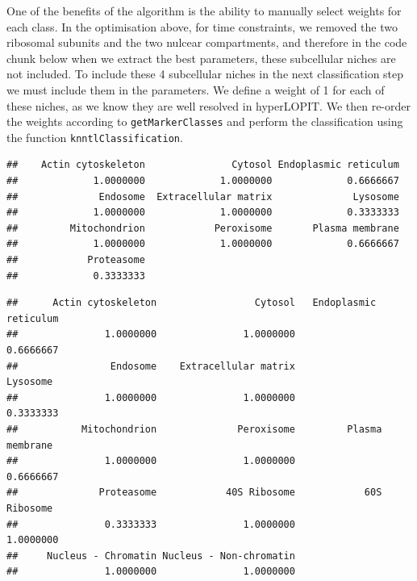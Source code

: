 One of the benefits of the algorithm is the ability to manually select
weights for each class. In the optimisation above, for time
constraints, we removed the two ribosomal subunits and the two nulcear
compartments, and therefore in the code chunk below when we extract
the best parameters, these subcellular niches are not included. To
include these 4 subcellular niches in the next classification step we
must include them in the parameters. We define a weight of 1 for each
of these niches, as we know they are well resolved in hyperLOPIT. We
then re-order the weights according to \texttt{getMarkerClasses} and
perform the classification using the function
\texttt{knntlClassification}.

\begin{knitrout}
\color{fgcolor}\begin{kframe}
\begin{alltt}
 \hlkwb{<-} 
\end{alltt}
\begin{verbatim}
##    Actin cytoskeleton               Cytosol Endoplasmic reticulum 
##             1.0000000             1.0000000             0.6666667 
##              Endosome  Extracellular matrix              Lysosome 
##             1.0000000             1.0000000             0.3333333 
##         Mitochondrion            Peroxisome       Plasma membrane 
##             1.0000000             1.0000000             0.6666667 
##            Proteasome 
##             0.3333333
\end{verbatim}
\begin{alltt}
 \hlkwb{<-} \hlstd{(}\hlstd{,} \hlstd{)}
 \hlkwb{<-} \hlstd{(}\hlstd{,} \hlstd{,}
                         \hlstd{,}
                         \hlstd{)}
 \hlkwb{<-} 
\end{alltt}
\begin{verbatim}
##      Actin cytoskeleton                 Cytosol   Endoplasmic reticulum 
##               1.0000000               1.0000000               0.6666667 
##                Endosome    Extracellular matrix                Lysosome 
##               1.0000000               1.0000000               0.3333333 
##           Mitochondrion              Peroxisome         Plasma membrane 
##               1.0000000               1.0000000               0.6666667 
##              Proteasome            40S Ribosome            60S Ribosome 
##               0.3333333               1.0000000               1.0000000 
##     Nucleus - Chromatin Nucleus - Non-chromatin 
##               1.0000000               1.0000000
\end{verbatim}
\begin{alltt}
 \hlkwb{<-} \hlstd{bestpar[}\hlstd{(hl)]}


\end{alltt}
\end{kframe}
\end{knitrout}
